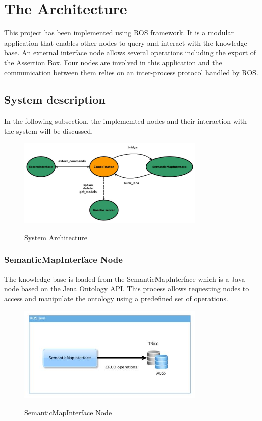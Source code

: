 \section{The Architecture}

This project has been implemented using ROS framework. It is a modular application that enables other nodes to query and interact with the knowledge base. An external interface node allows several operations including the export of the Assertion Box. Four nodes are involved in this application and the communication between them relies on an inter-process protocol handled by ROS.

\subsection{System description}
In the following subsection, the implememted nodes and their interaction with the system will be discussed. 

\begin{figure}[H]
\centering
\includegraphics[width=0.8\textwidth]{imgs/arch1.jpg}
\label{fig:actions}
\caption{System Architecture}
\end{figure}

\subsubsection{SemanticMapInterface Node}
The knowledge base is loaded from the SemanticMapInterface which is a Java node based on the Jena Ontology API. This process allows requesting nodes to access and manipulate the ontology using a predefined set of operations.

\begin{figure}[H]
\centering
\includegraphics[width=0.8\textwidth]{imgs/semantic.jpg}
\label{fig:actions}
\caption{SemanticMapInterface Node}
\end{figure}

